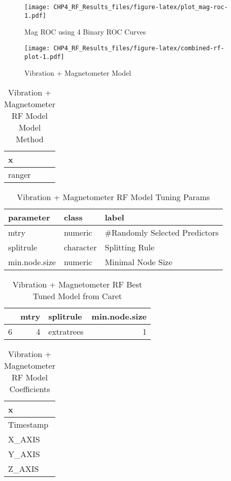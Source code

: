 \documentclass[]{article}
\begin{document}
\begin{figure}
\centering
\texttt{[image: CHP4\_RF\_Results\_files/figure-latex/plot\_mag-roc-1.pdf]}
\caption{Mag ROC using 4 Binary ROC Curves}
\end{figure}

\begin{figure}
\centering
\texttt{[image: CHP4\_RF\_Results\_files/figure-latex/combined-rf-plot-1.pdf]}
\caption{Vibration + Magnetometer Model}
\end{figure}

\begin{table}[!h]

\caption{\label{tab:combined-rf-params}Vibration + Magnetometer RF Model Model Method}
\centering
\begin{tabular}[t]{l}
\toprule
x\\
\midrule
ranger\\
\bottomrule
\end{tabular}
\end{table}

\begin{table}[!h]

\caption{\label{tab:combined-rf-params}Vibration + Magnetometer RF Model Tuning Params}
\centering
\begin{tabular}[t]{lll}
\toprule
parameter & class & label\\
\midrule
mtry & numeric & \#Randomly Selected Predictors\\
splitrule & character & Splitting Rule\\
min.node.size & numeric & Minimal Node Size\\
\bottomrule
\end{tabular}
\end{table}

\begin{table}[!h]

\caption{\label{tab:combined-rf-params}Vibration + Magnetometer RF Best Tuned Model from Caret}
\centering
\begin{tabular}[t]{lrlr}
\toprule
  & mtry & splitrule & min.node.size\\
\midrule
6 & 4 & extratrees & 1\\
\bottomrule
\end{tabular}
\end{table}

\begin{table}[!h]

\caption{\label{tab:combined-rf-params}Vibration + Magnetometer RF Model Coefficients}
\centering
\begin{tabular}[t]{l}
\toprule
x\\
\midrule
Timestamp\\
X\_AXIS\\
Y\_AXIS\\
Z\_AXIS\\
\bottomrule
\end{tabular}
\end{table}
\end{document}
